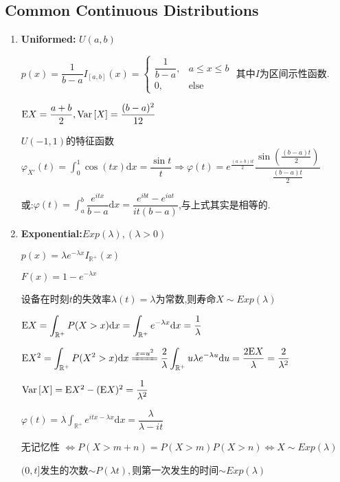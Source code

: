     \subsection{Common Continuous Distributions}
    \begin{enumerate}
      \item \textbf{Uniformed:} $U(a,b)$

        $p(x) = \dfrac{1}{b-a}I_{[a,b]}(x) = \left \{ \begin{matrix}\dfrac{1}{b-a}, & a\le x \le b \\0, &  \text{else}\end{matrix}\right.$
        其中$ I$为区间示性函数.

        $\text{E}X = \dfrac{a+b}{2}, \text{Var}\left[X\right] = \dfrac{(b-a)^2}{12}$

        $ U(-1,1)$的特征函数$\varphi_{X'}(t)=\int_{0}^1{\cos(tx)\mathrm{d}x} = \dfrac{\sin t}{t}\Rightarrow \varphi(t) =
      e^{\frac{(a+b)it}{2}}\dfrac{\sin(\frac{(b-a)t}{2})}{\frac{(b-a)t}{2}}$

      或:$ \varphi(t) = \int_{a}^b{\dfrac{e^{itx}}{b-a}\mathrm{d}x} = \dfrac{e^{ibt}-e^{iat}}{it(b-a)}$,与上式其实是相等的.

    \item \textbf{Exponential:}$Exp(\lambda),(\lambda > 0)$

      $p(x) = \lambda e^{-\lambda x}I_{\mathbb{R^+}}(x)$

      $F(x) = 1-e^{-\lambda x}$

      设备在时刻$t$的失效率$\lambda(t) = \lambda$为常数,则寿命$X\sim Exp(\lambda)$

      $\Ex{X} = \int_{\mathbb{R^+}}{P(X>x)\mathrm{d}x} = \int_{\mathbb{R^+}}{e^{-\lambda x}\mathrm{d}x} = \dfrac{1}{\lambda}$

      $ \Ex{X^2} = \int_{\mathbb{R^+}}{P(X^2 > x)\mathrm{d}x} \xlongequal{x = u^2} \dfrac{2}{\lambda}\int_{\mathbb{R^+}}{u\lambda e^{-\lambda u}\mathrm{d}u}
      = \dfrac{2\Ex{X}}{\lambda} = \dfrac{2}{\lambda^2}$

      $\text{Var}\left[X\right] = \text{E}X^2 - (\text{E}X)^2 = \dfrac{1}{\lambda^2}$

      $ \varphi(t) = \lambda\int_{\mathbb{R}^+}e^{itx-\lambda x}\mathrm{d}x=\dfrac{\lambda}{\lambda-it}$

      无记忆性 $\Leftrightarrow P(X>m+n) = P(X>m)P(X>n)\Leftrightarrow X\sim Exp(\lambda)$

          $(0,t]$发生的次数$\sim P(\lambda t),$则第一次发生的时间$\sim Exp(\lambda)$


\end{enumerate}
